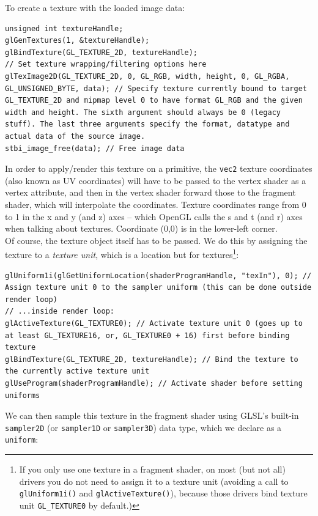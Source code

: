\documentclass[table, xcdraw]{article}%
\begin{document}
To create a texture with the loaded image data:

\begin{verbatim}
unsigned int textureHandle;
glGenTextures(1, &textureHandle);
glBindTexture(GL_TEXTURE_2D, textureHandle);
// Set texture wrapping/filtering options here
glTexImage2D(GL_TEXTURE_2D, 0, GL_RGB, width, height, 0, GL_RGBA, GL_UNSIGNED_BYTE, data); // Specify texture currently bound to target GL_TEXTURE_2D and mipmap level 0 to have format GL_RGB and the given width and height. The sixth argument should always be 0 (legacy stuff). The last three arguments specify the format, datatype and actual data of the source image.
stbi_image_free(data); // Free image data
\end{verbatim}

In order to apply/render this texture on a primitive, the \texttt{vec2} texture coordinates (also known as UV coordinates) will have to be passed to the vertex shader as a vertex attribute, and then in the vertex shader forward those to the fragment shader, which will interpolate the coordinates. Texture coordinates range from 0 to 1 in the x and y (and z) axes -- which OpenGL calls the s and t (and r) axes when talking about textures. Coordinate (0,0) is in the lower-left corner.\\
Of course, the texture object itself has to be passed. We do this by assigning the texture to a \emph{texture unit}, which is a location but for textures\footnote{If you only use one texture in a fragment shader, on most (but not all) drivers you do not need to assign it to a texture unit (avoiding a call to \texttt{glUniform1i()} and \texttt{glActiveTexture()}), because those drivers bind texture unit \texttt{GL_TEXTURE0} by default.)}:

\begin{verbatim}
glUniform1i(glGetUniformLocation(shaderProgramHandle, "texIn"), 0); // Assign texture unit 0 to the sampler uniform (this can be done outside render loop)
// ...inside render loop:
glActiveTexture(GL_TEXTURE0); // Activate texture unit 0 (goes up to at least GL_TEXTURE16, or, GL_TEXTURE0 + 16) first before binding texture
glBindTexture(GL_TEXTURE_2D, textureHandle); // Bind the texture to the currently active texture unit
glUseProgram(shaderProgramHandle); // Activate shader before setting uniforms
\end{verbatim}

We can then sample this texture in the fragment shader using GLSL's built-in \texttt{sampler2D} (or \texttt{sampler1D} or \texttt{sampler3D}) data type, which we declare as a \texttt{uniform}:
\end{document}
